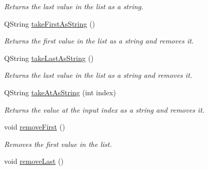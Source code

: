 \begin{DoxyCompactItemize}
\begin{DoxyCompactList}\small\item\em Returns the last value in the list as a string. \end{DoxyCompactList}\item 
\hypertarget{class_picto_1_1_variable_list_a938d2da7fca6b37df5c046e13e6ebe27}{Q\-String \hyperlink{class_picto_1_1_variable_list_a938d2da7fca6b37df5c046e13e6ebe27}{take\-First\-As\-String} ()}\label{class_picto_1_1_variable_list_a938d2da7fca6b37df5c046e13e6ebe27}

\begin{DoxyCompactList}\small\item\em Returns the first value in the list as a string and removes it. \end{DoxyCompactList}\item 
\hypertarget{class_picto_1_1_variable_list_ad37e2e29a7e51323e8cbd055d3dad80e}{Q\-String \hyperlink{class_picto_1_1_variable_list_ad37e2e29a7e51323e8cbd055d3dad80e}{take\-Last\-As\-String} ()}\label{class_picto_1_1_variable_list_ad37e2e29a7e51323e8cbd055d3dad80e}

\begin{DoxyCompactList}\small\item\em Returns the last value in the list as a string and removes it. \end{DoxyCompactList}\item 
\hypertarget{class_picto_1_1_variable_list_a0f5407359c937a6f6589d9f138a562f4}{Q\-String \hyperlink{class_picto_1_1_variable_list_a0f5407359c937a6f6589d9f138a562f4}{take\-At\-As\-String} (int index)}\label{class_picto_1_1_variable_list_a0f5407359c937a6f6589d9f138a562f4}

\begin{DoxyCompactList}\small\item\em Returns the value at the input index as a string and removes it. \end{DoxyCompactList}\item 
\hypertarget{class_picto_1_1_variable_list_a19388f7c3d4d79d01f3445ed2bbce6c3}{void \hyperlink{class_picto_1_1_variable_list_a19388f7c3d4d79d01f3445ed2bbce6c3}{remove\-First} ()}\label{class_picto_1_1_variable_list_a19388f7c3d4d79d01f3445ed2bbce6c3}

\begin{DoxyCompactList}\small\item\em Removes the first value in the list. \end{DoxyCompactList}\item 
\hypertarget{class_picto_1_1_variable_list_af3cf4bca9a370376f444f0309f945115}{void \hyperlink{class_picto_1_1_variable_list_af3cf4bca9a370376f444f0309f945115}{remove\-Last} ()}\label{class_picto_1_1_variable_list_af3cf4bca9a370376f444f0309f945115}


\end{DoxyCompactItemize}
